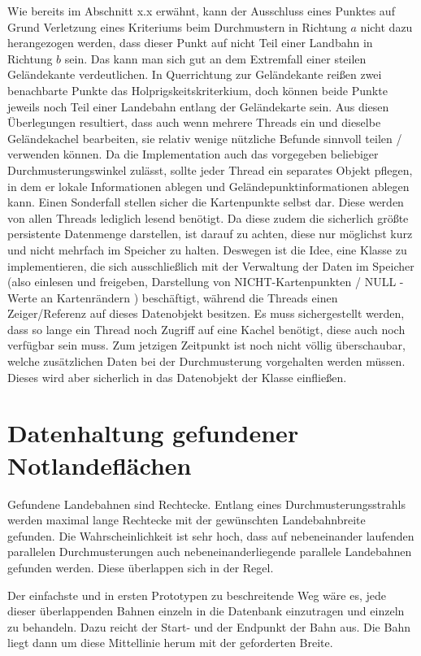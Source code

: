 \documentclass[
11pt, %
a4paper, %
oneside, %
pdfspacing, %
headinclude,
BCOR5mm, %
ngerman, %
bibtotocnumbered,
]{scrartcl}
\begin{document}
Wie bereits im Abschnitt x.x erwähnt, kann der Ausschluss eines Punktes auf Grund Verletzung eines Kriteriums beim Durchmustern in Richtung $a$ nicht dazu herangezogen werden, dass dieser Punkt auf nicht Teil einer Landbahn in Richtung $b$ sein. Das kann man sich gut an dem Extremfall einer steilen Geländekante verdeutlichen. In Querrichtung zur Geländekante reißen zwei benachbarte Punkte das Holprigskeitskriterkium, doch können beide Punkte jeweils noch Teil einer Landebahn entlang der Geländekarte sein.
Aus diesen Überlegungen resultiert, dass auch wenn mehrere Threads ein und dieselbe Geländekachel bearbeiten, sie relativ wenige nützliche Befunde sinnvoll teilen / verwenden können. Da die Implementation auch das vorgegeben beliebiger Durchmusterungswinkel zulässt, sollte jeder Thread ein separates Objekt pflegen, in dem er lokale Informationen ablegen und Geländepunktinformationen ablegen kann. 
Einen Sonderfall stellen sicher die Kartenpunkte selbst dar. Diese werden von allen Threads lediglich lesend benötigt. Da diese zudem die sicherlich größte persistente Datenmenge darstellen, ist darauf zu achten, diese nur möglichst kurz und nicht mehrfach im Speicher zu halten. Deswegen ist die Idee, eine Klasse zu implementieren, die sich ausschließlich mit der Verwaltung der Daten im Speicher (also einlesen und freigeben, Darstellung von NICHT-Kartenpunkten / NULL - Werte an Kartenrändern ) beschäftigt, während die Threads einen Zeiger/Referenz auf dieses Datenobjekt besitzen. Es muss sichergestellt werden, dass so lange ein Thread noch Zugriff auf eine Kachel benötigt, diese auch noch verfügbar sein muss. Zum jetzigen Zeitpunkt ist noch nicht völlig überschaubar, welche zusätzlichen Daten bei der Durchmusterung vorgehalten werden müssen. Dieses wird aber sicherlich in das Datenobjekt der Klasse einfließen.

\section{Datenhaltung gefundener Notlandeflächen}

Gefundene Landebahnen sind Rechtecke. Entlang eines Durchmusterungsstrahls werden maximal lange Rechtecke mit der gewünschten Landebahnbreite gefunden. Die Wahrscheinlichkeit ist sehr hoch, dass auf nebeneinander laufenden parallelen Durchmusterungen auch nebeneinanderliegende parallele Landebahnen gefunden werden. Diese überlappen sich in der Regel. 

Der einfachste und in ersten Prototypen zu beschreitende Weg wäre es, jede dieser überlappenden Bahnen einzeln in die Datenbank einzutragen und einzeln zu behandeln. Dazu reicht der Start- und der Endpunkt der Bahn aus. Die Bahn liegt dann um diese Mittellinie herum mit der geforderten Breite.
\end{document}
